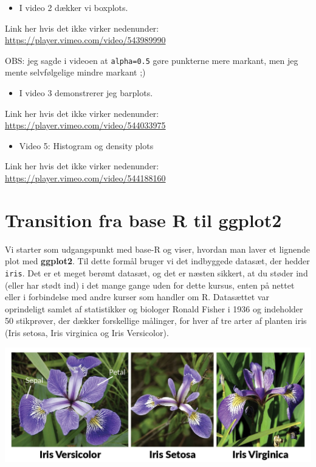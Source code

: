 \documentclass[
]{book}
\providecommand{\tightlist}{%
  \setlength{\itemsep}{0pt}\setlength{\parskip}{0pt}}
\begin{document}
\begin{itemize}
\tightlist
\item
  I video 2 dækker vi boxplots.
\end{itemize}

Link her hvis det ikke virker nedenunder: \url{https://player.vimeo.com/video/543989990}

OBS: jeg sagde i videoen at \texttt{alpha=0.5} gøre punkterne mere markant, men jeg mente selvfølgelige mindre markant ;)

\begin{itemize}
\tightlist
\item
  I video 3 demonstrerer jeg barplots.
\end{itemize}

Link her hvis det ikke virker nedenunder: \url{https://player.vimeo.com/video/544033975}

\begin{itemize}
\tightlist
\item
  Video 5: Histogram og density plots
\end{itemize}

Link her hvis det ikke virker nedenunder: \url{https://player.vimeo.com/video/544188160}

\hypertarget{transition-fra-base-r-til-ggplot2}{%
\section{Transition fra base R til ggplot2}\label{transition-fra-base-r-til-ggplot2}}

Vi starter som udgangspunkt med base-R og viser, hvordan man laver et lignende plot med \textbf{ggplot2}. Til dette formål bruger vi det indbyggede datasæt, der hedder \texttt{iris}. Det er et meget berømt datasæt, og det er næsten sikkert, at du støder ind (eller har stødt ind) i det mange gange uden for dette kursus, enten på nettet eller i forbindelse med andre kurser som handler om R. Datasættet var oprindeligt samlet af statistikker og biologer Ronald Fisher i 1936 og indeholder 50 stikprøver, der dækker forskellige målinger, for hver af tre arter af planten iris (Iris setosa, Iris virginica og Iris Versicolor).

\includegraphics[width=0.85\linewidth]{plots/iris_picture}
\end{document}
